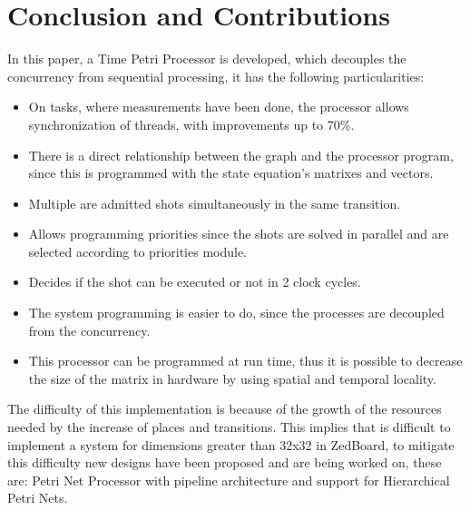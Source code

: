 \section{Conclusion and Contributions}

	In this paper, a Time Petri Processor is developed, which decouples the concurrency from sequential 
	processing, it has the following particularities:
	\begin{itemize}
  		\item On tasks, where measurements have been done, the processor allows synchronization of 
  				threads, with improvements up to 70\%.
		\item There is a direct relationship between the graph and the processor program, since this 
				is programmed with the state equation's matrixes and vectors.
		\item Multiple are admitted shots simultaneously in the same transition.
		\item Allows programming priorities since the shots are solved in parallel and are selected 
				according to priorities module.
		\item Decides if the shot can be executed or not in 2 clock cycles.
		\item The system programming is easier to do, since the processes are decoupled from the concurrency.
		\item This processor can be programmed at run time, thus it is possible to decrease the size 
				of the matrix in hardware by using spatial and temporal locality.
	\end{itemize}
	
	The difficulty of this implementation is because of the growth of the resources needed by the 
	increase of places and transitions. This implies that is difficult to implement a system for 
	dimensions greater than 32x32 in ZedBoard, to mitigate this difficulty new designs have been 
	proposed and are being worked on, these are: Petri Net Processor with pipeline architecture and 
	support for Hierarchical Petri Nets.